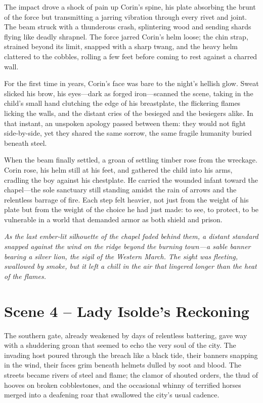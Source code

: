 \documentclass[11pt,twoside]{book}
\begin{document}
The impact drove a shock of pain up Corin's spine, his plate absorbing the brunt of the force but transmitting a jarring vibration through every rivet and joint.  The beam struck with a thunderous crash, splintering wood and sending shards flying like deadly shrapnel.  The force jarred Corin's helm loose; the chin strap, strained beyond its limit, snapped with a sharp twang, and the heavy helm clattered to the cobbles, rolling a few feet before coming to rest against a charred wall.

For the first time in years, Corin's face was bare to the night's hellish glow.  Sweat slicked his brow, his eyes---dark as forged iron---scanned the scene, taking in the child's small hand clutching the edge of his breastplate, the flickering flames licking the walls, and the distant cries of the besieged and the besiegers alike.  In that instant, an unspoken apology passed between them: they would not fight side-by-side, yet they shared the same sorrow, the same fragile humanity buried beneath steel.

When the beam finally settled, a groan of settling timber rose from the wreckage.  Corin rose, his helm still at his feet, and gathered the child into his arms, cradling the boy against his chestplate.  He carried the wounded infant toward the chapel---the sole sanctuary still standing amidst the rain of arrows and the relentless barrage of fire.  Each step felt heavier, not just from the weight of his plate but from the weight of the choice he had just made: to see, to protect, to be vulnerable in a world that demanded armor as both shield and prison.

\textit{As the last ember-lit silhouette of the chapel faded behind them, a distant standard snapped against the wind on the ridge beyond the burning town---a sable banner bearing a silver lion, the sigil of the Western March.  The sight was fleeting, swallowed by smoke, but it left a chill in the air that lingered longer than the heat of the flames.}

\section{Scene 4 -- Lady Isolde's Reckoning}
The southern gate, already weakened by days of relentless battering, gave way with a shuddering groan that seemed to echo the very soul of the city.  The invading host poured through the breach like a black tide, their banners snapping in the wind, their faces grim beneath helmets dulled by soot and blood.  The streets became rivers of steel and flame; the clamor of shouted orders, the thud of hooves on broken cobblestones, and the occasional whinny of terrified horses merged into a deafening roar that swallowed the city's usual cadence.
\end{document}
